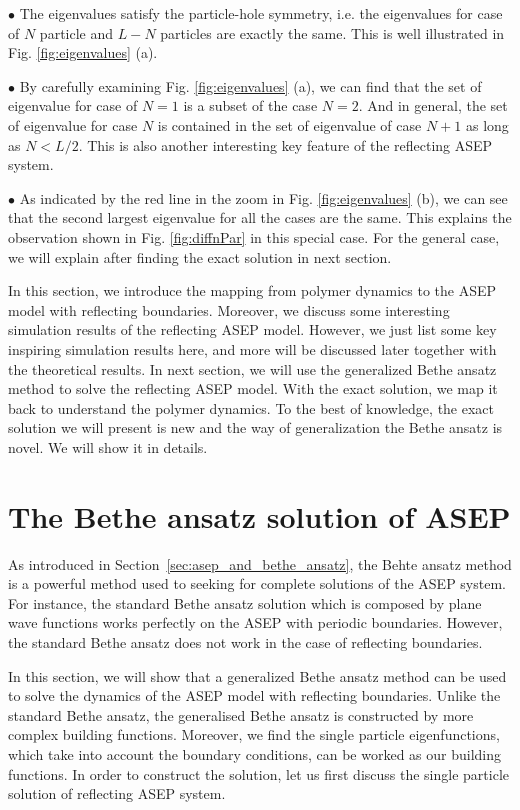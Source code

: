 $\bullet$ The eigenvalues satisfy the particle-hole symmetry, i.e. the eigenvalues for case of $N$ particle and $L-N$ particles are exactly the same. This is well illustrated in Fig. \ref{fig:eigenvalues} (a). 

$\bullet$ By carefully examining Fig. \ref{fig:eigenvalues} (a), we can find that the set of eigenvalue for case of $N=1$ is a subset of the case $N=2$. And in general, the set of eigenvalue for case $N$ is contained in the set of eigenvalue of case $N+1$ as long as $N<L/2$. This is also another interesting key feature of the reflecting ASEP system.

$\bullet$ As indicated by the red line in the zoom in Fig. \ref{fig:eigenvalues} (b), we can see that the second largest eigenvalue for all the cases are the same. This explains the observation shown in Fig. \ref{fig:diffnPar} in this special case. For the general case, we will explain after finding the exact solution in next section.

In this section, we introduce the mapping from polymer dynamics to the ASEP model with reflecting boundaries. Moreover, we discuss some interesting simulation results of the reflecting ASEP model. However, we just list some key inspiring simulation results here, and more will be discussed later together with the theoretical results. 
In next section, we will use the generalized Bethe ansatz method to solve the reflecting ASEP model. With the exact solution, we map it back to understand the polymer dynamics. To the best of knowledge, the exact solution we will present is new and the way of generalization the Bethe ansatz is novel. We will show it in details. 



\section{The Bethe ansatz solution of ASEP}
\label{sec:the_bethe_ansatz_solution_of_asep}

As introduced in Section~\ref{sec:asep_and_bethe_ansatz}, the Behte ansatz method is a powerful method used to seeking for complete solutions of the ASEP system. For instance, the standard Bethe ansatz solution which is composed by plane wave functions works perfectly on the ASEP with periodic boundaries. However, the standard Bethe ansatz does not work in the case of reflecting boundaries.

In this section, we will show that a generalized Bethe ansatz method can be used to solve the dynamics of the ASEP model with reflecting boundaries. Unlike the standard Bethe ansatz, the generalised Bethe ansatz is constructed by more complex building functions. Moreover, we find the single particle eigenfunctions, which take into account the boundary conditions, can be worked as our building functions. In order to construct the solution, let us first discuss the single particle solution of reflecting ASEP system.

